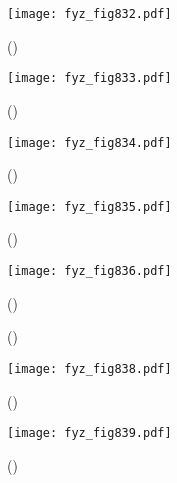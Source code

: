     \begin{figure}[ht!] %
      \centering
      \texttt{[image: fyz\_fig832.pdf]}
      \caption{
               (\cite[s.~707]{Feynman02})}
      \label{fyz:fig832}
    \end{figure}
    
    \begin{figure}[ht!] %
      \centering
      \texttt{[image: fyz\_fig833.pdf]}
      \caption{
               (\cite[s.~707]{Feynman02})}
      \label{fyz:fig833}
    \end{figure}
    
    \begin{figure}[ht!] %
      \centering
      \texttt{[image: fyz\_fig834.pdf]}
      \caption{
               (\cite[s.~707]{Feynman02})}
      \label{fyz:fig834}
    \end{figure}
    
    \begin{figure}[ht!] %
      \centering
      \texttt{[image: fyz\_fig835.pdf]}
      \caption{
               (\cite[s.~707]{Feynman02})}
      \label{fyz:fig835}
    \end{figure}
    
    \begin{figure}[ht!] %
      \centering
      \texttt{[image: fyz\_fig836.pdf]}
      \caption{
               (\cite[s.~707]{Feynman02})}
      \label{fyz:fig836}
    \end{figure}

    \begin{figure}[ht!] %
      \centering
                     \newline
      \caption{
               (\cite[s.~748]{Feynman02})}
      \label{fyz:fig837}
    \end{figure}

    \begin{figure}[ht!] %
      \centering
      \texttt{[image: fyz\_fig838.pdf]}
      \caption{
               (\cite[s.~707]{Feynman02})}
      \label{fyz:fig838}
    \end{figure}

    \begin{figure}[ht!] %
      \centering
      \texttt{[image: fyz\_fig839.pdf]}
      \caption{
               (\cite[s.~707]{Feynman02})}
      \label{fyz:fig839}
    \end{figure}

